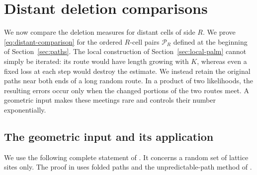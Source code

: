 \section{Distant deletion comparisons}\label{sec:long-palm}

We now compare the deletion measures for distant cells of side $R$.
We prove \eqref{eq:distant-comparison} for the ordered $R$-cell pairs
$\mathcal P_R$ defined at the beginning of Section~\ref{sec:paths}.
The local construction of Section~\ref{sec:local-palm} cannot simply be
iterated: its route would have length growing with $K$, whereas even a
fixed loss at each step would destroy the estimate.  We instead retain
the original paths near both ends of a long random route.  In a product
of two likelihoods, the resulting errors occur only when the changed
portions of the two routes meet.  A geometric input makes these meetings
rare and controls their number exponentially.

\subsection{The geometric input and its application}

We use the following complete statement of \cite[Proposition~7.1]{D}.
It concerns a random set of lattice sites only.  The proof in
\cite[Section~7]{D} uses folded paths and the unpredictable-path
method of \cite{BPP}.

